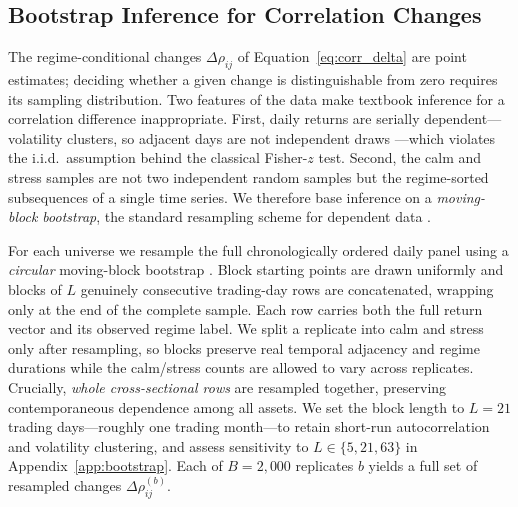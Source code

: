 \subsection{Bootstrap Inference for Correlation Changes}
\label{subsec:bootstrap_inference}

The regime-conditional changes $\Delta\rho_{ij}$ of Equation~\eqref{eq:corr_delta} are point estimates; deciding whether a given change is distinguishable from zero requires its sampling distribution. Two features of the data make textbook inference for a correlation difference inappropriate. First, daily returns are serially dependent---volatility clusters, so adjacent days are not independent draws \citep{cont2001empirical}---which violates the i.i.d.\ assumption behind the classical Fisher-$z$ test. Second, the calm and stress samples are not two independent random samples but the regime-sorted subsequences of a single time series. We therefore base inference on a \emph{moving-block bootstrap}, the standard resampling scheme for dependent data \citep{efron1979bootstrap,kunsch1989,lahiri2003resampling}.

For each universe we resample the full chronologically ordered daily panel using a \emph{circular} moving-block bootstrap \citep{politisromano1992circular}. Block starting points are drawn uniformly and blocks of $L$ genuinely consecutive trading-day rows are concatenated, wrapping only at the end of the complete sample. Each row carries both the full return vector and its observed regime label. We split a replicate into calm and stress only after resampling, so blocks preserve real temporal adjacency and regime durations while the calm/stress counts are allowed to vary across replicates. Crucially, \emph{whole cross-sectional rows} are resampled together, preserving contemporaneous dependence among all assets. We set the block length to $L = 21$ trading days---roughly one trading month---to retain short-run autocorrelation and volatility clustering, and assess sensitivity to $L \in \{5, 21, 63\}$ in Appendix~\ref{app:bootstrap}. Each of $B = 2{,}000$ replicates $b$ yields a full set of resampled changes $\Delta\rho_{ij}^{(b)}$.

